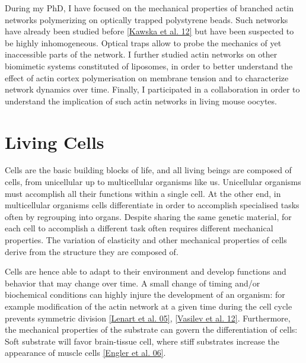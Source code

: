 \documentclass[A4paperpaper,11pt,english]{sphinxmanual}
\begin{document}
During my PhD, I have focused on the mechanical properties of branched actin
networks polymerizing on optically trapped polystyrene beads. Such networks have already been
studied before {\hyperref[index-latex:kawska2012]{{[}Kawska et al. 12{]}}} but have been suspected to be highly
inhomogeneous. Optical traps allow to probe the mechanics of yet inaccessible parts of
the network.
I further studied actin
networks on other biomimetic systems constituted of liposomes, in order to better
understand the effect of actin cortex polymerisation on membrane tension and to
characterize network dynamics over time. Finally,  I participated in a
collaboration in order to understand the implication of such actin networks in
living mouse oocytes.


\section{Living Cells}
\label{index-latex:living-cells}
Cells are the basic building blocks of life, and all living beings are composed of
cells, from unicellular up to multicellular organisms like us. Unicellular
organisms must accomplish all their functions within a single cell. At the other end,
in multicellular organisms cells differentiate in order to accomplish specialised
tasks often by regrouping into organs. Despite sharing the same genetic
material, for each cell to accomplish a different task often requires different
mechanical properties. The variation of elasticity and other
mechanical properties of cells derive from the structure they are composed of.

Cells are hence able to adapt to their environment and develop functions and
behavior that may change over time. A small change of timing and/or biochemical
conditions can highly injure the development of an organism: for example modification of
the actin network at a given time during the cell cycle prevents symmetric division
{\hyperref[index-latex:lenart2005]{{[}Lenart et al. 05{]}}}, {\hyperref[index-latex:vasilev2012]{{[}Vasilev et al. 12{]}}}. Furthermore, the mechanical properties of the substrate can
govern the differentiation of cells: Soft substrate will favor brain-tissue
cell, where stiff substrates increase the appearance of muscle cells
{\hyperref[index-latex:engler2006]{{[}Engler et al. 06{]}}}.
\end{document}

